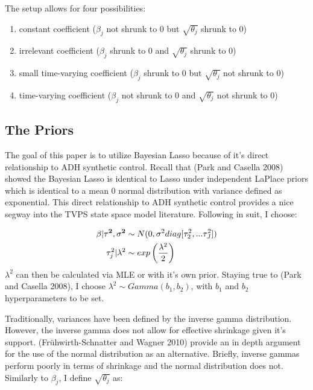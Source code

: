 \documentclass[
]{article}
\begin{document}
The setup allows for four possibilities:

\begin{enumerate}
\def\labelenumi{\roman{enumi})}
\item
  constant coefficient (\(\beta_j\) not shrunk to 0 but
  \(\sqrt{\theta_j}\) shrunk to 0)
\item
  irrelevant coefficient (\(\beta_j\) shrunk to 0 and
  \(\sqrt{\theta_j}\) shrunk to 0)
\item
  small time-varying coefficient (\(\beta_j\) shrunk to 0 but
  \(\sqrt{\theta_j}\) not shrunk to 0)
\item
  time-varying coefficient (\(\beta_j\) not shrunk to 0 and
  \(\sqrt{\theta_j}\) not shrunk to 0)
\end{enumerate}

\hypertarget{the-priors}{%
\subsection{The Priors}\label{the-priors}}

The goal of this paper is to utilize Bayesian Lasso because of it's
direct relationship to ADH synthetic control. Recall that (Park and
Casella 2008) showed the Bayesian Lasso is identical to Lasso under
independent LaPlace priors which is identical to a mean 0 normal
distribution with variance defined as exponential. This direct
relationship to ADH synthetic control provides a nice segway into the
TVPS state space model literature. Following in suit, I choose:

\[
\begin{aligned}
\bf{\beta} | \tau^2, \sigma^2 &\sim N(0,\sigma^2 diag[\tau_2^2,...\tau_J^2])\\
\tau_j^2 | \lambda^2 &\sim exp\left(\frac{\lambda^2}{2}\right)
\end{aligned}
\] \(\lambda^2\) can then be calculated via MLE or with it's own prior.
Staying true to (Park and Casella 2008), I choose
\(\lambda^2 \sim Gamma(b_1,b_2)\), with \(b_1\) and \(b_2\)
hyperparameters to be set.

Traditionally, variances have been defined by the inverse gamma
distribution. However, the inverse gamma does not allow for effective
shrinkage given it's support. (Frühwirth-Schnatter and Wagner 2010)
provide an in depth argument for the use of the normal distribution as
an alternative. Briefly, inverse gammas perform poorly in terms of
shrinkage and the normal distribution does not. Similarly to
\(\beta_j\), I define \(\sqrt{\theta_j}\) as:
\end{document}

